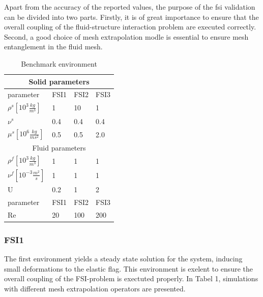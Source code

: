 Apart from the accuracy of the reported values, the purpose of the fsi validation can be divided into two parts. Firstly, it is of great importance to ensure that the overall coupling of the fluid-structure interaction problem are executed correctly. Second, a good choice of mesh extrapolation modle is essential to ensure mesh entanglement in the fluid mesh. 


\begin{table}[h!]
\centering
\caption{Benchmark environment}
\label{my-label}
\begin{tabular}{ |p{3cm}||p{2cm}|p{2cm}|p{2cm}|  }
 \hline
 \multicolumn{4}{|c|}{Solid parameters} \\
 \hline
 parameter              & FSI1 & FSI2 & FSI3 \\
 \hline
 $\rho^s [10^{3} \frac{kg}{m^3}]$ & 1    & 10   & 1    \\
$\nu^s$ & 0.4  & 0.4  & 0.4  \\
$\mu^s  [10^{6}\frac{kg}{ms^2}]$  & 0.5  & 0.5  & 2.0  \\
 \hline
 \multicolumn{4}{|c|}{Fluid parameters} \\
 \hline
$\rho^f [10^{3}\frac{kg}{m^3}]$ & 1    & 1    & 1    \\
$\nu^f  [10^{-3}\frac{m^2}{s}]$  & 1    & 1    & 1    \\
U                      & 0.2  & 1    & 2    \\
parameter              & FSI1 & FSI2 & FSI3 \\
Re                     & 20   & 100  & 200 \\
\hline
\end{tabular}
\end{table}

\newpage
\subsubsection{FSI1}
The first environment yields a steady state solution for the system, inducing small deformations to the elastic flag. This environment is exelent to ensure the overall coupling of the FSI-problem is exectuted properly. In Tabel 1, simulations with different mesh extrapolation operators are presented.

